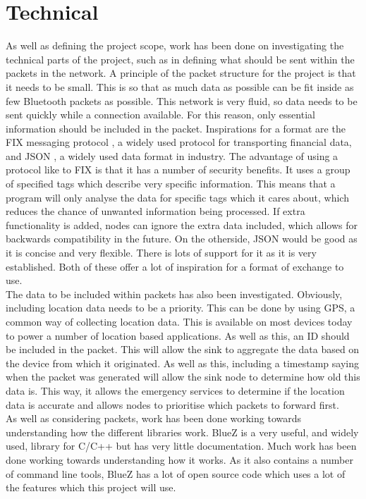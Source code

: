 \documentclass{report}
\begin{document}
\section{Technical}
As well as defining the project scope, work has been done on investigating the technical parts of the project, such as in defining what should be sent within the packets in the network. A principle of the packet structure for the project is that it needs to be small. This is so that as much data as possible can be fit inside as few Bluetooth packets \cite{blepacket} as possible. This network is very fluid, so data needs to be sent quickly while a connection available. For this reason, only essential information should be included in the packet. Inspirations for a format are the FIX messaging protocol \cite{FIXSPEC}, a widely used protocol for transporting financial data, and JSON \cite{json}, a widely used data format in industry. The advantage of using a protocol like to FIX is that it has a number of security benefits. It uses a group of specified tags which describe very specific information. This means that a program will only analyse the data for specific tags which it cares about, which reduces the chance of unwanted information being processed. If extra functionality is added, nodes can ignore the extra data included, which allows for backwards compatibility in the future. On the otherside, JSON would be good as it is concise and very flexible. There is lots of support for it as it is very established. Both of these offer a lot of inspiration for a format of exchange to use.
\bigskip\\
The data to be included within packets has also been investigated. Obviously, including location data needs to be a priority. This can be done by using GPS, a common way of collecting location data. This is available on most devices today to power a number of location based applications. As well as this, an ID should be included in the packet. This will allow the sink to aggregate the data based on the device from which it originated. As well as this, including a timestamp saying when the packet was generated will allow the sink node to determine how old this data is. This way, it allows the emergency services to determine if the location data is accurate and allows nodes to prioritise which packets to forward first. 
\bigskip\\
As well as considering packets, work has been done working towards understanding how the different libraries work. BlueZ \cite{bluez} is a very useful, and widely used, library for C/C++ but has very little documentation. Much work has been done working towards understanding how it works. As it also contains a number of command line tools, BlueZ has a lot of open source code which uses a lot of the features which this project will use. 
\end{document}
